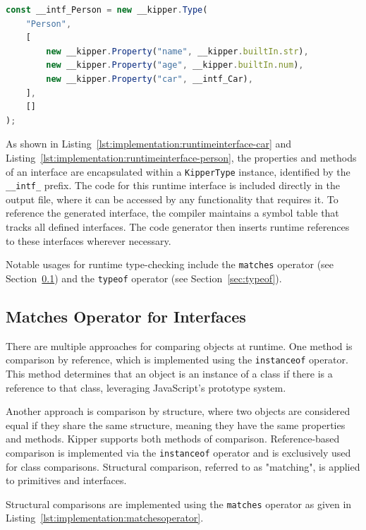 \begin{lstlisting}[language=Typescript,caption=The runtime representation of the example interface \lstinline|Person|,label=lst:implementation:runtimeinterface-person]
const __intf_Person = new __kipper.Type(
	"Person",
	[
		new __kipper.Property("name", __kipper.builtIn.str),
		new __kipper.Property("age", __kipper.builtIn.num),
		new __kipper.Property("car", __intf_Car),
	],
	[]
);
\end{lstlisting}

As shown in Listing~\ref{lst:implementation:runtimeinterface-car} and Listing~\ref{lst:implementation:runtimeinterface-person}, the properties and methods of an interface are encapsulated within a \lstinline|KipperType| instance, identified by the  \lstinline|__intf_| prefix. The code for this runtime interface is included directly in the output file, where it can be accessed by any functionality that requires it. To reference the generated interface, the compiler maintains a symbol table that tracks all defined interfaces. The code generator then inserts runtime references to these interfaces wherever necessary.

Notable usages for runtime type-checking include the \lstinline|matches| operator (see Section~\ref{sec:matches-operator}) and the \lstinline|typeof| operator (see Section~\ref{sec:typeof}).

\subsection{Matches Operator for Interfaces}
\label{sec:matches-operator}

There are multiple approaches for comparing objects at runtime. One method is comparison by reference, which is implemented using the \lstinline|instanceof| operator. This method determines that an object is an instance of a class if there is a reference to that class, leveraging JavaScript's prototype system.

Another approach is comparison by structure, where two objects are considered equal if they share the same structure, meaning they have the same properties and methods. Kipper supports both methods of comparison. Reference-based comparison is implemented via the \lstinline|instanceof| operator and is exclusively used for class comparisons. Structural comparison, referred to as "matching", is applied to primitives and interfaces. 

Structural comparisons are implemented using the \lstinline|matches| operator as given in Listing~\ref{lst:implementation:matchesoperator}.

